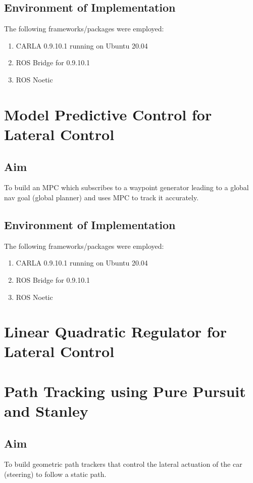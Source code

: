 \documentclass[a4paper,12pt]{report}
\begin{document}
\subsection{Environment of Implementation}

The following frameworks/packages were employed:
\begin{enumerate}
	\item CARLA 0.9.10.1 running on Ubuntu 20.04
	\item ROS Bridge for 0.9.10.1
	\item ROS Noetic
\end{enumerate}

\section{Model Predictive Control for Lateral Control}

\subsection{Aim}
To build an MPC which subscribes to a waypoint generator leading to a global nav goal (global planner) and uses MPC to track it accurately.

\subsection{Environment of Implementation}

The following frameworks/packages were employed:
\begin{enumerate}
	\item CARLA 0.9.10.1 running on Ubuntu 20.04
	\item ROS Bridge for 0.9.10.1
	\item ROS Noetic
\end{enumerate}

\section{Linear Quadratic Regulator for Lateral Control}

\section{Path Tracking using Pure Pursuit and Stanley}
\subsection{Aim}
To build geometric path trackers that control the lateral actuation of the car (steering) to follow a static path.
\end{document}
